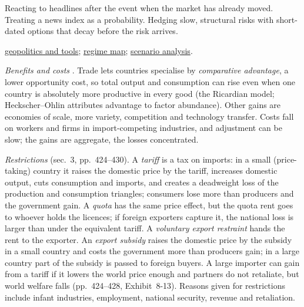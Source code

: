\begin{qfmethod}
 Reacting to headlines after the event when the market has already moved. Treating a news index as a probability. Hedging slow, structural risks with short-dated options that decay before the risk arrives.

 \hyperref[def:geopolitics-institutions-tools]{geopolitics and tools}; \hyperref[def:macro-regime-asset-map]{regime map}; \hyperref[meth:sensitivity-scenario-risk-measures]{scenario analysis}.

\end{qfmethod}

\begin{qfmethod}\label{meth:trade-benefits-restrictions-blocs}
 \emph{Benefits and costs} \citep[chap.~8, secs.~2.3--2.4, pp.~411--423]{economics-investment-decision-makers-2013}. Trade lets countries specialise by \emph{comparative advantage}, a lower opportunity cost, so total output and consumption can rise even when one country is absolutely more productive in every good (the Ricardian model; Heckscher--Ohlin attributes advantage to factor abundance). Other gains are economies of scale, more variety, competition and technology transfer. Costs fall on workers and firms in import-competing industries, and adjustment can be slow; the gains are aggregate, the losses concentrated.

\emph{Restrictions} (sec.~3, pp.~424--430). A \emph{tariff} is a tax on imports: in a small (price-taking) country it raises the domestic price by the tariff, increases domestic output, cuts consumption and imports, and creates a deadweight loss of the production and consumption triangles; consumers lose more than producers and the government gain. A \emph{quota} has the same price effect, but the quota rent goes to whoever holds the licences; if foreign exporters capture it, the national loss is larger than under the equivalent tariff. A \emph{voluntary export restraint} hands the rent to the exporter. An \emph{export subsidy} raises the domestic price by the subsidy in a small country and costs the government more than producers gain; in a large country part of the subsidy is passed to foreign buyers. A large importer can gain from a tariff if it lowers the world price enough and partners do not retaliate, but world welfare falls (pp.~424--428, Exhibit~8-13). Reasons given for restrictions include infant industries, employment, national security, revenue and retaliation.


\end{qfmethod}
